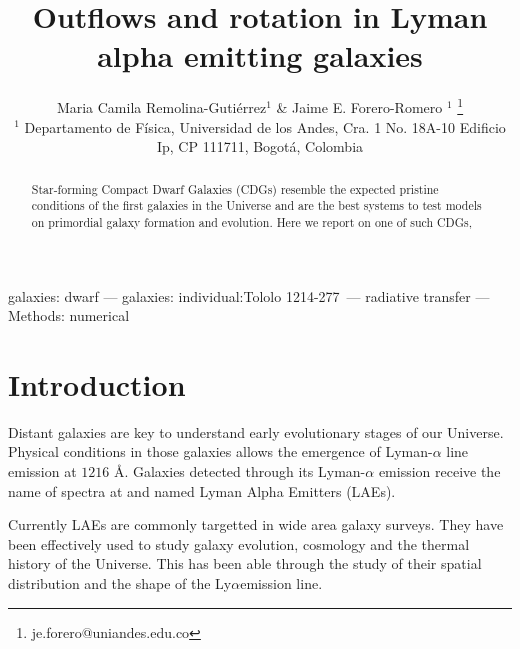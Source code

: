 \documentclass[a4,useAMS,usenatbib,usegraphicx]{mn2e}
\newcommand{\tol}{Tololo 1214-277}
\newcommand{\lya}{Ly$\alpha$}
\begin{document}
\title[Outflows and rotation in LAEs]{
Outflows and rotation in Lyman alpha emitting galaxies}
\author[M.C. Remolina-Gutierrez \& J.E. Forero-Romero]{
  Maria Camila Remolina-Guti\'errez$^1$ \&
  Jaime E. Forero-Romero $^{1}$ \thanks{je.forero@uniandes.edu.co}\\
  $^1$ Departamento de F\'isica, Universidad de los Andes, Cra. 1
  No. 18A-10 Edificio Ip, CP 111711, Bogot\'a, Colombia \\
}

\maketitle
       

\begin{abstract}
  Star-forming Compact Dwarf Galaxies (CDGs) resemble the expected
  pristine conditions of the first galaxies in the Universe and
  are the best systems to test models on primordial
galaxy formation and evolution.    
Here we report on one of such CDGs,

\end{abstract}

\begin{keywords}
galaxies: dwarf --- galaxies: individual:\tol\ --- radiative transfer --- Methods: numerical 
\end{keywords}




\section{Introduction}
\label{sec:intro}

Distant galaxies are key to understand early evolutionary stages of
our Universe.
Physical conditions in those galaxies allows the emergence of
Lyman-$\alpha$ line emission at $1216$ \AA \cite{PartrigePeebles}.
Galaxies detected through its Lyman-$\alpha$ emission receive the name of
spectra at  and named Lyman Alpha Emitters (LAEs).

Currently LAEs are commonly targetted in wide area galaxy surveys.
They have been effectively used to study galaxy evolution,
cosmology and the thermal history of the Universe.
This has been able through the study of their spatial distribution and
the shape of the \lya emission line.
\end{document}
